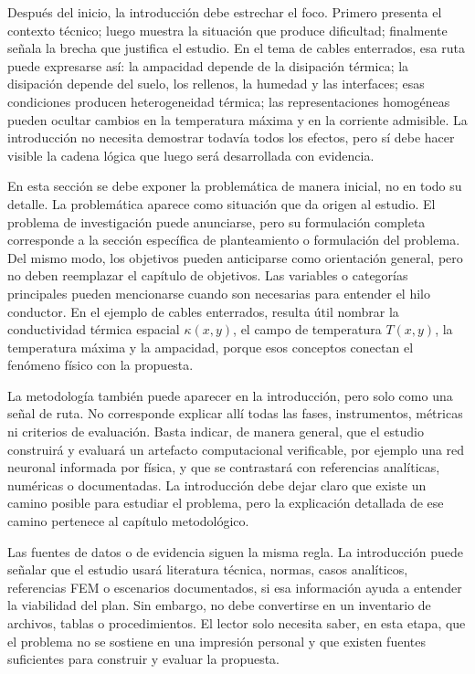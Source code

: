 \documentclass[11pt]{article}
\begin{document}
Después del inicio, la introducción debe estrechar el foco. Primero presenta el contexto técnico; luego muestra la situación que produce dificultad; finalmente señala la brecha que justifica el estudio. En el tema de cables enterrados, esa ruta puede expresarse así: la ampacidad depende de la disipación térmica; la disipación depende del suelo, los rellenos, la humedad y las interfaces; esas condiciones producen heterogeneidad térmica; las representaciones homogéneas pueden ocultar cambios en la temperatura máxima y en la corriente admisible. La introducción no necesita demostrar todavía todos los efectos, pero sí debe hacer visible la cadena lógica que luego será desarrollada con evidencia.

En esta sección se debe exponer la problemática de manera inicial, no en todo su detalle. La problemática aparece como situación que da origen al estudio. El problema de investigación puede anunciarse, pero su formulación completa corresponde a la sección específica de planteamiento o formulación del problema. Del mismo modo, los objetivos pueden anticiparse como orientación general, pero no deben reemplazar el capítulo de objetivos. Las variables o categorías principales pueden mencionarse cuando son necesarias para entender el hilo conductor. En el ejemplo de cables enterrados, resulta útil nombrar la conductividad térmica espacial \(\kappa(x,y)\), el campo de temperatura \(T(x,y)\), la temperatura máxima y la ampacidad, porque esos conceptos conectan el fenómeno físico con la propuesta.

La metodología también puede aparecer en la introducción, pero solo como una señal de ruta. No corresponde explicar allí todas las fases, instrumentos, métricas ni criterios de evaluación. Basta indicar, de manera general, que el estudio construirá y evaluará un artefacto computacional verificable, por ejemplo una red neuronal informada por física, y que se contrastará con referencias analíticas, numéricas o documentadas. La introducción debe dejar claro que existe un camino posible para estudiar el problema, pero la explicación detallada de ese camino pertenece al capítulo metodológico.

Las fuentes de datos o de evidencia siguen la misma regla. La introducción puede señalar que el estudio usará literatura técnica, normas, casos analíticos, referencias FEM o escenarios documentados, si esa información ayuda a entender la viabilidad del plan. Sin embargo, no debe convertirse en un inventario de archivos, tablas o procedimientos. El lector solo necesita saber, en esta etapa, que el problema no se sostiene en una impresión personal y que existen fuentes suficientes para construir y evaluar la propuesta.
\end{document}
